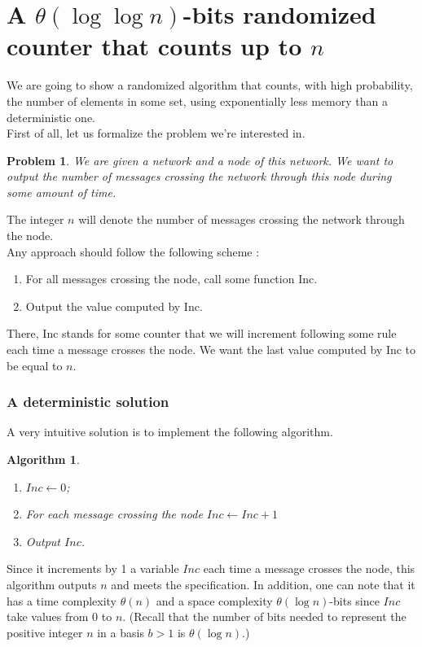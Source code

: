 \documentclass{article}
\theoremstyle{plain}
\theoremstyle{plain}
\theoremstyle{plain}
\newtheorem{algo}[thm]{Algorithm}
\theoremstyle{plain}
\newtheorem{pb}[thm]{Problem}
\begin{document}
\part*{A $\theta\left(\log \log n\right)$-bits randomized counter that counts up to $n$}
We are going to show a randomized algorithm that counts, with high probability, the number of elements in some set, using exponentially less memory than a deterministic one.\\
First of all, let us formalize the problem we're interested in.

\begin{pb}
We are given a network and a node of this network. We want to output the number of messages crossing the network through this node during some amount of time.
\end{pb}

The integer $n$ will denote the number of messages crossing the network through the node.\\Any approach should follow the following scheme : 


\begin{enumerate}
	\item For all messages crossing the node, call some function Inc. 
	\item Output the value computed by Inc.
\end{enumerate}

There, Inc stands for some counter that we will increment following some rule each time a message crosses the node. We want the last value computed by Inc to be equal to $n$.

\section{A deterministic solution}
A very intuitive solution is to implement the following algorithm.
\begin{algo}
\begin{enumerate}
  \item $Inc \leftarrow 0$;
	\item For each message crossing the node $Inc\leftarrow Inc + 1$
	\item Output $Inc$.
\end{enumerate}
\end{algo}

Since it increments by 1 a variable $Inc$ each time a message crosses the node, this algorithm outputs $n$ and meets the specification. In addition, one can note that it has a time complexity $\theta\left(n\right)$ and a space complexity $\theta\left(\log n\right)$-bits since $Inc$ take values from $0$ to $n$. (Recall that the number of bits needed to represent the positive integer $n$ in a basis $b > 1$ is $\theta\left(\log n\right)$.)
\end{document}
